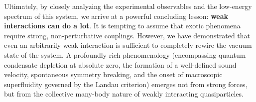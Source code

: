 Ultimately, by closely analyzing the experimental observables and the low-energy spectrum of this system, we arrive at a powerful concluding lesson: \textbf{weak interactions can do a lot}. It is tempting to assume that exotic phenomena require strong, non-perturbative couplings. However, we have demonstrated that even an arbitrarily weak interaction is sufficient to completely rewire the vacuum state of the system. A profoundly rich phenomenology (encompassing quantum condensate depletion at absolute zero, the formation of a well-defined sound velocity, spontaneous symmetry breaking, and the onset of macroscopic superfluidity governed by the Landau criterion) emerges not from strong forces, but from the collective many-body nature of weakly interacting quasiparticles.